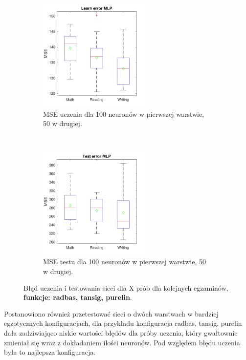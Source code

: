 \documentclass[12pt]{article}
\begin{document}
\begin{figure}[H]
\begin{subfigure}[t]{0.48\textwidth} 
\centering
\includegraphics[height=2.2in]{radbas_tansig_purelin_50_learnBoxplot.pdf}
\caption{MSE uczenia dla  100 neuronów w pierwszej warstwie, 50 w drugiej.}
\end{subfigure}
~~
\begin{subfigure}[t]{0.48\textwidth} 
\centering
\includegraphics[height=2.2in]{radbas_tansig_purelin_50_testBoxplot.pdf}
\caption{MSE testu dla 100 neuronów w pierwszej warstwie, 50 w drugiej.}
\end{subfigure}

\caption{Błąd uczenia i testowania sieci dla X prób dla kolejnych egzaminów, \textbf{funkcje: radbas, tansig, purelin}.}
\end{figure}

Postanowiono również przetestować sieci o dwóch warstwach w bardziej egzotycznych konfiguracjach, dla przykładu konfiguracja radbas, tansig, purelin dała zadziwiająco niskie wartości błędów dla próby uczenia, który gwałtownie zmieniał się wraz z dokładaniem ilości neuronów. Pod względem błędu uczenia była to najlepsza konfiguracja.
\end{document}

